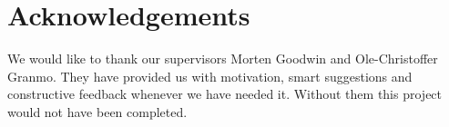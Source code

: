 \chapter*{Acknowledgements}%
%

We would like to thank our supervisors Morten Goodwin and Ole-Christoffer Granmo. They have provided us with motivation, smart suggestions and constructive feedback whenever we have needed it. Without them this project would not have been completed. 